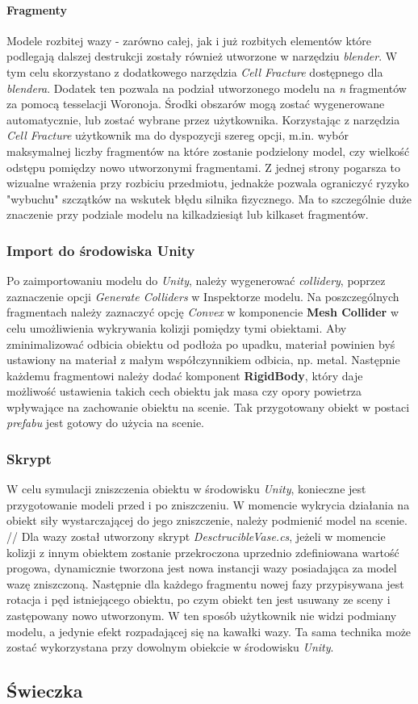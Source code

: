 \paragraph{Fragmenty}
Modele rozbitej wazy - zarówno całej, jak i już rozbitych elementów które podlegają dalszej destrukcji zostały również utworzone w narzędziu \textit{blender}.
W tym celu skorzystano z dodatkowego narzędzia \textit{Cell Fracture} dostępnego dla \textit{blendera}. Dodatek ten pozwala na podział utworzonego modelu na  \textit{n} fragmentów za pomocą tesselacji Woronoja. Środki obszarów mogą zostać wygenerowane automatycznie, lub zostać wybrane przez użytkownika. Korzystając z narzędzia \textit{Cell Fracture} użytkownik ma do dyspozycji szereg opcji, m.in. wybór maksymalnej liczby fragmentów na które zostanie podzielony model, czy wielkość odstępu pomiędzy nowo utworzonymi fragmentami. Z jednej strony pogarsza to wizualne wrażenia przy rozbiciu przedmiotu, jednakże pozwala ograniczyć ryzyko "wybuchu" szczątków na wskutek błędu silnika fizycznego. Ma to szczególnie duże znaczenie przy podziale modelu na kilkadziesiąt lub kilkaset fragmentów.

\subsubsection{Import do środowiska Unity}
Po zaimportowaniu modelu do \textit{Unity}, należy wygenerować \textit{collidery}, poprzez zaznaczenie opcji \textit{Generate Colliders} w Inspektorze modelu. Na poszczególnych fragmentach należy zaznaczyć opcję \textit{Convex} w komponencie \textbf{Mesh Collider} w celu umożliwienia wykrywania kolizji pomiędzy tymi obiektami. Aby zminimalizować odbicia obiektu od podłoża po upadku, materiał powinien byś ustawiony na materiał z małym współczynnikiem odbicia, np. metal. Następnie każdemu fragmentowi należy dodać komponent \textbf{RigidBody}, który daje możliwość ustawienia takich cech obiektu jak masa czy opory powietrza wpływające na zachowanie obiektu na scenie. Tak przygotowany obiekt w postaci \textit{prefabu} jest gotowy do użycia na scenie.

\subsubsection{Skrypt}
W celu symulacji zniszczenia obiektu w środowisku \textit{Unity}, konieczne jest przygotowanie modeli przed i po zniszczeniu. W momencie wykrycia działania na obiekt siły wystarczającej do jego zniszczenie, należy podmienić model na scenie. //
Dla wazy został utworzony skrypt \textit{DesctrucibleVase.cs}, jeżeli w momencie kolizji z innym obiektem zostanie przekroczona uprzednio zdefiniowana wartość progowa, dynamicznie tworzona jest nowa instancji wazy posiadająca za model wazę zniszczoną. Następnie dla każdego fragmentu nowej fazy przypisywana jest rotacja i pęd istniejącego obiektu, po czym obiekt ten jest usuwany ze sceny i zastępowany nowo utworzonym. W ten sposób użytkownik nie widzi podmiany modelu, a jedynie efekt rozpadającej się na kawałki wazy. Ta sama technika może zostać wykorzystana przy dowolnym obiekcie w środowisku \textit{Unity}.

\subsection{Świeczka}


